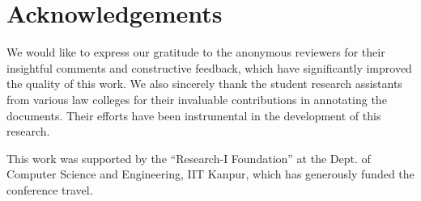 \section*{Acknowledgements}
We would like to express our gratitude to the anonymous reviewers for their insightful comments and constructive feedback, which have significantly improved the quality of this work. We also sincerely thank the student research assistants from various law colleges for their invaluable contributions in annotating the documents. Their efforts have been instrumental in the development of this research.  

This work was supported by the ``Research-I Foundation'' at the Dept. of Computer Science and Engineering, IIT Kanpur, which has generously funded the conference travel.